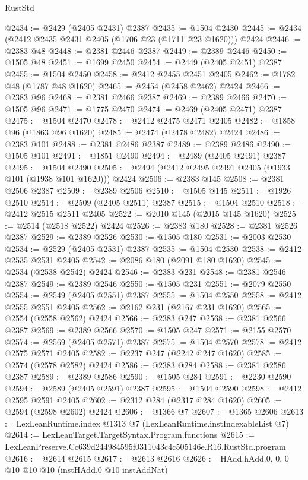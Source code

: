 \begin{lexlean}{RustStd}
\begin{coremodule}
@2434 := @2429 (@2405 @2431) @2387
@2435 := @1504 @2430
@2445 := @2434 (@2412 @2435 @2431 @2405 (@1706 @23 (@1711 @23 @1620))) @2424
@2446 := @2383 @48
@2448 := @2381 @2446 @2387
@2449 := @2389 @2446
@2450 := @1505 @48
@2451 := @1699 @2450
@2454 := @2449 (@2405 @2451) @2387
@2455 := @1504 @2450
@2458 := @2412 @2455 @2451 @2405
@2462 := @1782 @48 (@1787 @48 @1620)
@2465 := @2454 (@2458 @2462) @2424
@2466 := @2383 @96
@2468 := @2381 @2466 @2387
@2469 := @2389 @2466
@2470 := @1505 @96
@2471 := @1775 @2470
@2474 := @2469 (@2405 @2471) @2387
@2475 := @1504 @2470
@2478 := @2412 @2475 @2471 @2405
@2482 := @1858 @96 (@1863 @96 @1620)
@2485 := @2474 (@2478 @2482) @2424
@2486 := @2383 @101
@2488 := @2381 @2486 @2387
@2489 := @2389 @2486
@2490 := @1505 @101
@2491 := @1851 @2490
@2494 := @2489 (@2405 @2491) @2387
@2495 := @1504 @2490
@2505 := @2494 (@2412 @2495 @2491 @2405 (@1933 @101 (@1938 @101 @1620))) @2424
@2506 := @2383 @145
@2508 := @2381 @2506 @2387
@2509 := @2389 @2506
@2510 := @1505 @145
@2511 := @1926 @2510
@2514 := @2509 (@2405 @2511) @2387
@2515 := @1504 @2510
@2518 := @2412 @2515 @2511 @2405
@2522 := @2010 @145 (@2015 @145 @1620)
@2525 := @2514 (@2518 @2522) @2424
@2526 := @2383 @180
@2528 := @2381 @2526 @2387
@2529 := @2389 @2526
@2530 := @1505 @180
@2531 := @2003 @2530
@2534 := @2529 (@2405 @2531) @2387
@2535 := @1504 @2530
@2538 := @2412 @2535 @2531 @2405
@2542 := @2086 @180 (@2091 @180 @1620)
@2545 := @2534 (@2538 @2542) @2424
@2546 := @2383 @231
@2548 := @2381 @2546 @2387
@2549 := @2389 @2546
@2550 := @1505 @231
@2551 := @2079 @2550
@2554 := @2549 (@2405 @2551) @2387
@2555 := @1504 @2550
@2558 := @2412 @2555 @2551 @2405
@2562 := @2162 @231 (@2167 @231 @1620)
@2565 := @2554 (@2558 @2562) @2424
@2566 := @2383 @247
@2568 := @2381 @2566 @2387
@2569 := @2389 @2566
@2570 := @1505 @247
@2571 := @2155 @2570
@2574 := @2569 (@2405 @2571) @2387
@2575 := @1504 @2570
@2578 := @2412 @2575 @2571 @2405
@2582 := @2237 @247 (@2242 @247 @1620)
@2585 := @2574 (@2578 @2582) @2424
@2586 := @2383 @284
@2588 := @2381 @2586 @2387
@2589 := @2389 @2586
@2590 := @1505 @284
@2591 := @2230 @2590
@2594 := @2589 (@2405 @2591) @2387
@2595 := @1504 @2590
@2598 := @2412 @2595 @2591 @2405
@2602 := @2312 @284 (@2317 @284 @1620)
@2605 := @2594 (@2598 @2602) @2424
@2606 := @1366 @7
@2607 := @1365 @2606
@2613 := LexLeanRuntime.index @1313 @7 (LexLeanRuntime.instIndexableList @7)
@2614 := LexLeanTarget.TargetSyntax.Program.functions
@2615 := LexLeanPreserve.Cc639d244984595f0311043c4c505146e.R16.RustStd.program
@2616 := @2614 @2615
@2617 := @2613 @2616
@2626 := HAdd.hAdd.{0, 0, 0} @10 @10 @10 (instHAdd.{0} @10 instAddNat)

\end{coremodule}
\end{lexlean}
